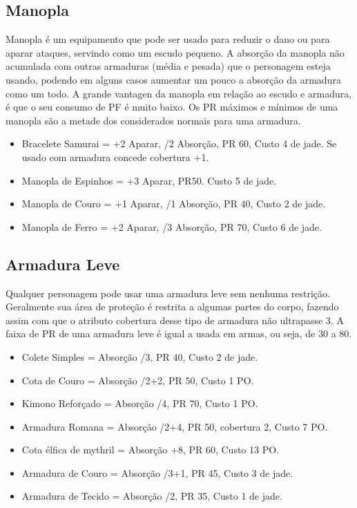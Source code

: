 \subsection{Manopla}
Manopla é um equipamento que pode ser usado para reduzir o dano ou para aparar ataques, servindo como um escudo pequeno. A absorção da manopla não acumulada com outras armaduras (média e pesada) que o personagem esteja usando, podendo em alguns casos aumentar um pouco a absorção da armadura como um todo. A grande vantagen da manopla em relação ao escudo e armadura, é que o seu consumo de PF é muito baixo. Os PR máximos e mínimos de uma manopla são a metade dos considerados normais para uma armadura.

\begin{itemize}
	\item Bracelete Samurai = +2 Aparar, /2 Absorção, PR 60, Custo 4 de jade. Se usado com armadura concede cobertura +1.
	\item Manopla de Espinhos  =  +3 Aparar, PR50.	Custo 5 de jade.
	\item Manopla de Couro = +1 Aparar, /1 Absorção, PR 40, Custo 2 de jade.
	\item Manopla de Ferro = +2 Aparar, /3 Absorção, PR 70, Custo 6 de jade.
\end{itemize}	


\subsection{Armadura Leve}
Qualquer personagem pode usar uma armadura leve sem nenhuma restrição. Geralmente sua área de proteção é restrita a algumas partes do corpo, fazendo assim com que o atributo cobertura desse tipo de armadura não ultrapasse 3. A faixa de PR de uma armadura leve é igual a usada em armas, ou seja, de 30 a 80.

\begin{itemize}
	\item Colete Simples = Absorção /3, PR 40, Custo 2 de jade.
	\item Cota de Couro  =  Absorção /2+2, PR 50, Custo 1 PO.
	\item Kimono Reforçado  =  Absorção /4, PR 70, Custo 1 PO.	
	\item Armadura Romana  =  Absorção /2+4, PR 50, cobertura 2, Custo 7 PO.	
	\item Cota élfica de mythril =  Absorção +8, PR 60, Custo 13 PO.	
	\item Armadura de Couro = Absorção /3+1, PR 45, Custo 3 de jade.
	\item Armadura de Tecido = Absorção /2, PR 35, Custo 1 de jade.		
\end{itemize}	



